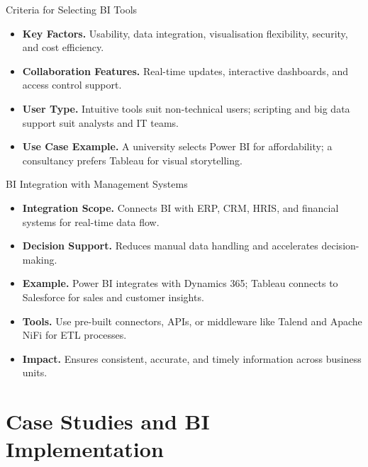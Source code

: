 \documentclass[aspectratio=169, table]{beamer}
\begin{document}
\begin{frame}{Criteria for Selecting BI Tools}
	\vspace{20pt}
	\begin{itemize}
		\item \textbf{Key Factors.} Usability, data integration, visualisation flexibility, security, and cost efficiency.
		\item \textbf{Collaboration Features.} Real-time updates, interactive dashboards, and access control support.
		\item \textbf{User Type.} Intuitive tools suit non-technical users; scripting and big data support suit analysts and IT teams.
		\item \textbf{Use Case Example.} A university selects Power BI for affordability; a consultancy prefers Tableau for visual storytelling.
	\end{itemize}
\end{frame}



\begin{frame}{BI Integration with Management Systems}
	\vspace{20pt}
	\begin{itemize}
		\item \textbf{Integration Scope.} Connects BI with ERP, CRM, HRIS, and financial systems for real-time data flow.
		\item \textbf{Decision Support.} Reduces manual data handling and accelerates decision-making.
		\item \textbf{Example.} Power BI integrates with Dynamics 365; Tableau connects to Salesforce for sales and customer insights.
		\item \textbf{Tools.} Use pre-built connectors, APIs, or middleware like Talend and Apache NiFi for ETL processes.
		\item \textbf{Impact.} Ensures consistent, accurate, and timely information across business units.
	\end{itemize}
\end{frame}




\section{Case Studies and BI Implementation}
\end{document}
